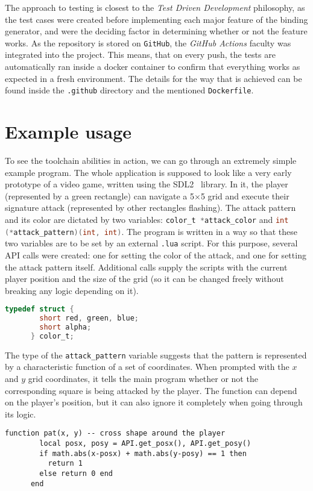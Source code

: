 \documentclass[polish, english]{iithesis}
\begin{document}
  The approach to testing is closest to the \textit{Test Driven Development} philosophy, as the test cases were created before implementing each major feature of the binding generator, and were the deciding factor in determining whether or not the feature works.
  As the repository is stored on \texttt{GitHub}, the \textit{GitHub Actions} faculty was integrated into the project.
  This means, that on every push, the tests are automatically ran inside a docker container to confirm that everything works as expected in a fresh environment.
  The details for the way that is achieved can be found inside the \texttt{.github} directory and the mentioned \texttt{Dockerfile}.


  \section{Example usage}
    To see the toolchain abilities in action, we can go through an extremely simple example program.
    The whole application is supposed to look like a very early prototype of a video game, written using the SDL2~\cite{sdl2} library.
    In it, the player (represented by a green rectangle) can navigate a 5$\times$5 grid and execute their signature attack (represented by other rectangles flashing).
    The attack pattern and its color are dictated by two variables: \lstinline[language=c]|color_t *attack_color| and \lstinline[language=c]|int (*attack_pattern)(int, int)|.
    The program is written in a way so that these two variables are to be set by an external \texttt{.lua} script.
    For this purpose, several API calls were created: one for setting the color of the attack, and one for setting the attack pattern itself.
    Additional calls supply the scripts with the current player position and the size of the grid (so it can be changed freely without breaking any logic depending on it).
    \begin{lstlisting}[language=c, caption=\texttt{color\_t type definition}]
      typedef struct {
        short red, green, blue;
        short alpha;
      } color_t;
    \end{lstlisting}

    The type of the \texttt{attack\_pattern} variable suggests that the pattern is represented by a characteristic function of a set of coordinates.
    When prompted with the $x$ and $y$ grid coordinates, it tells the main program whether or not the corresponding square is being attacked by the player.
    The function can depend on the player's position, but it can also ignore it completely when going through its logic.
    \begin{lstlisting}[language={[5.2]Lua}, caption=Example pattern dictating function]
      function pat(x, y) -- cross shape around the player
        local posx, posy = API.get_posx(), API.get_posy()
        if math.abs(x-posx) + math.abs(y-posy) == 1 then 
          return 1
        else return 0 end
      end 
    \end{lstlisting}
\end{document}
